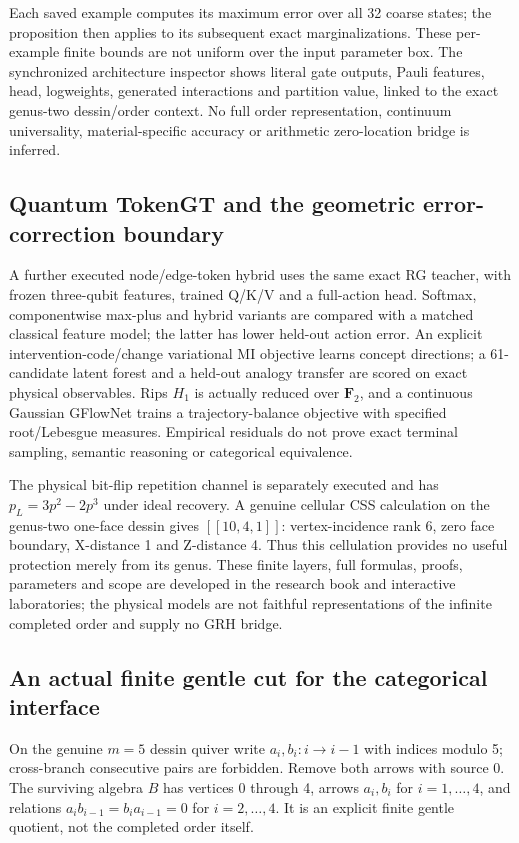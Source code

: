 \documentclass[11pt,oneside,openany]{book}
\theoremstyle{definition}\newtheorem{definition}[theorem]{Definition}
\theoremstyle{remark}\newtheorem{remark}[theorem]{Remark}
\begin{document}
Each saved example computes its maximum error over all 32 coarse states;
the proposition then applies to its subsequent exact marginalizations.
These per-example finite bounds are not uniform over the input parameter
box. The synchronized architecture inspector shows literal gate outputs,
Pauli features, head, logweights, generated interactions and partition
value, linked to the exact genus-two dessin/order context. No full order
representation, continuum universality, material-specific accuracy or
arithmetic zero-location bridge is inferred.

\subsection{Quantum TokenGT and the geometric error-correction boundary}
A further executed node/edge-token hybrid uses the same exact RG teacher,
with frozen three-qubit features, trained Q/K/V and a full-action head.
Softmax, componentwise max-plus and hybrid variants are compared with a
matched classical feature model; the latter has lower held-out action error.
An explicit intervention-code/change variational MI objective learns concept
directions; a 61-candidate latent forest and a held-out analogy transfer are
scored on exact physical observables. Rips $ H_1$ is actually reduced over
$\mathbf F_2$, and a continuous Gaussian GFlowNet trains a trajectory-balance
objective with specified root/Lebesgue measures. Empirical residuals do not
prove exact terminal sampling, semantic reasoning or categorical equivalence.

The physical bit-flip repetition channel is separately executed and has
$ p_L=3 p^2-2 p^3$ under ideal recovery. A genuine cellular CSS calculation on
the genus-two one-face dessin gives $[[10,4,1]]$: vertex-incidence rank 6,
zero face boundary, X-distance 1 and Z-distance 4. Thus this cellulation
provides no useful protection merely from its genus. These finite layers,
full formulas, proofs, parameters and scope are developed in the research
book and interactive laboratories; the physical models are not faithful
representations of the infinite completed order and supply no GRH bridge.

\subsection{An actual finite gentle cut for the categorical interface}
\label{rg:cut}
On the genuine $ m=5$ dessin quiver write
$ a_i,b_i:i\to i-1$ with indices modulo 5; cross-branch consecutive pairs
are forbidden. Remove both arrows with source 0. The surviving algebra $ B $
has vertices 0 through 4, arrows $ a_i,b_i $ for $ i=1,\ldots,4$, and relations
$ a_i b_{i-1}=b_i a_{i-1}=0$ for $ i=2,\ldots,4$. It is an explicit finite
gentle quotient, not the completed order itself.
\end{document}
